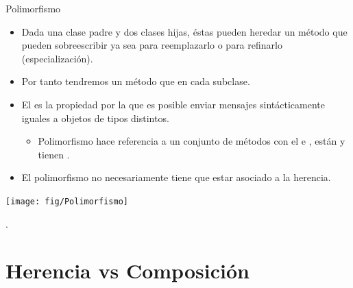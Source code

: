 \documentclass[10pt,envcountsect,spanish]{beamer}
\begin{document}
\begin{frame}{Polimorfismo}

\begin{itemize}\small 
\item Dada una clase padre  y dos clases hijas, éstas pueden heredar un método que pueden sobreescribir ya sea para reemplazarlo o para refinarlo (especialización).

\item Por tanto tendremos un método que  en cada subclase.


\item El  es la propiedad por la que es posible enviar mensajes sintácticamente iguales a objetos de tipos distintos.
\begin{itemize}
\item Polimorfismo hace referencia a un conjunto de métodos con el  e , están  y tienen .
\end{itemize}

\item El polimorfismo no necesariamente tiene que estar asociado a la herencia.
\end{itemize}

\centerline{\texttt{[image: fig/Polimorfismo]}}
\vskip -0.3cm


.
\end{frame}









\section{Herencia vs Composición}
\end{document}
